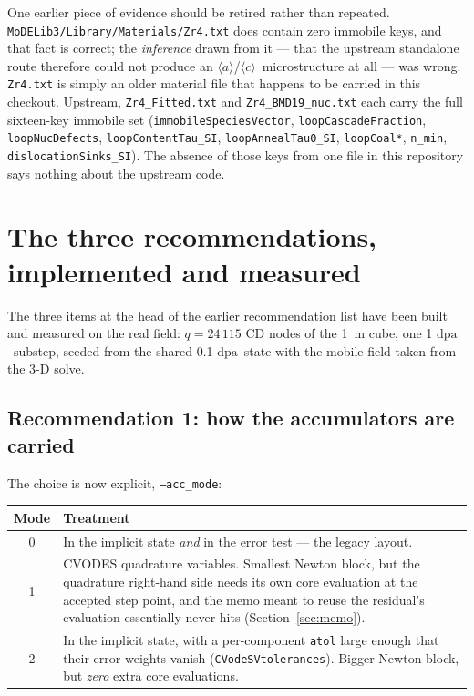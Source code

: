 \documentclass[11pt,a4paper]{article}
\newcommand{\code}[1]{\texttt{\small #1}}
\newcommand{\dpa}{\ensuremath{\mathrm{dpa}}}
\newcommand{\aloop}{\ensuremath{\langle a\rangle}}
\newcommand{\cloop}{\ensuremath{\langle c\rangle}}
\begin{document}
One earlier piece of evidence should be retired rather than repeated.
\code{MoDELib3/Library/Materials/Zr4.txt} does contain zero immobile keys, and
that fact is correct; the \emph{inference} drawn from it --- that the upstream
standalone route therefore could not produce an \aloop/\cloop\ microstructure at
all --- was wrong. \code{Zr4.txt} is simply an older material file that happens
to be carried in this checkout. Upstream, \code{Zr4\_Fitted.txt} and
\code{Zr4\_BMD19\_nuc.txt} each carry the full sixteen-key immobile set
(\code{immobileSpeciesVector}, \code{loopCascadeFraction}, \code{loopNucDefects},
\code{loopContentTau\_SI}, \code{loopAnnealTau0\_SI}, \code{loopCoal*},
\code{n\_min}, \code{dislocationSinks\_SI}). The absence of those keys from one
file in this repository says nothing about the upstream code.

\section{The three recommendations, implemented and measured}
\label{sec:recs}

The three items at the head of the earlier recommendation list have been built
and measured on the real field: $q = 24\,115$ CD nodes of the 1~\textmu m cube,
one 1 \dpa\ substep, seeded from the shared 0.1 \dpa\ state with the mobile
field taken from the 3-D solve.

\subsection{Recommendation 1: how the accumulators are carried}

The choice is now explicit, \code{--acc\_mode}:

\begin{center}
\begin{tabular}{cp{11.4cm}}
\toprule
Mode & Treatment \\
\midrule
0 & In the implicit state \emph{and} in the error test --- the legacy layout. \\
1 & CVODES quadrature variables. Smallest Newton block, but the quadrature
    right-hand side needs its own core evaluation at the accepted step point,
    and the memo meant to reuse the residual's evaluation essentially never
    hits (Section~\ref{sec:memo}). \\
2 & In the implicit state, with a per-component \code{atol} large enough that
    their error weights vanish (\code{CVodeSVtolerances}). Bigger Newton block,
    but \emph{zero} extra core evaluations. \\
\bottomrule
\end{tabular}
\end{center}
\end{document}
